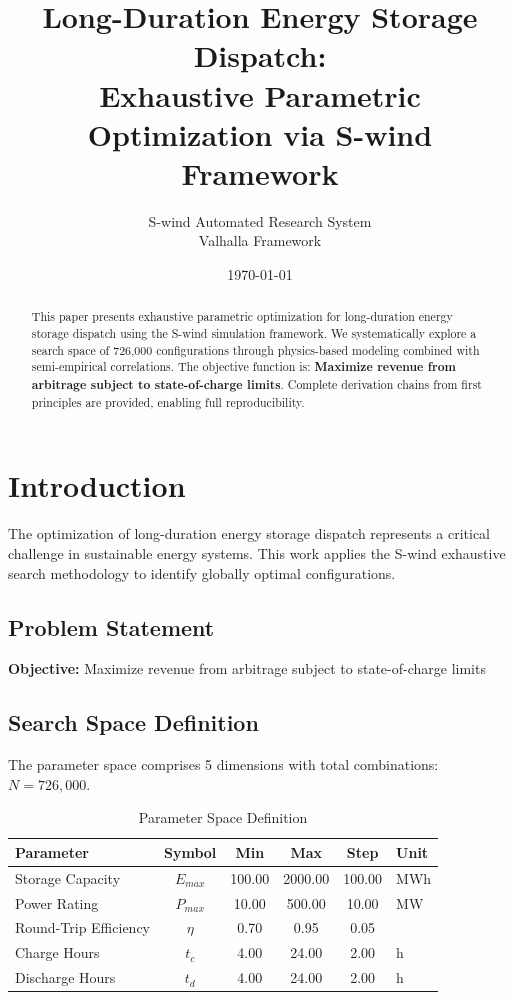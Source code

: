 \documentclass[11pt,twocolumn]{article}
\title{Long-Duration Energy Storage Dispatch: \\Exhaustive Parametric Optimization via S-wind Framework}
\author{S-wind Automated Research System\\Valhalla Framework}
\date{\today}
\begin{document}
\maketitle

\begin{abstract}
This paper presents exhaustive parametric optimization for long-duration energy storage dispatch using the S-wind simulation framework.
We systematically explore a search space of 726,000 configurations through physics-based modeling
combined with semi-empirical correlations. The objective function is: \textbf{Maximize revenue from arbitrage subject to state-of-charge limits}.
Complete derivation chains from first principles are provided, enabling full reproducibility.
\end{abstract}

\section{Introduction}
The optimization of long-duration energy storage dispatch represents a critical challenge in sustainable energy systems.
This work applies the S-wind exhaustive search methodology to identify globally optimal configurations.

\subsection{Problem Statement}
\textbf{Objective:} Maximize revenue from arbitrage subject to state-of-charge limits

\subsection{Search Space Definition}
The parameter space comprises 5 dimensions with total combinations: $N = 726,000$.

\begin{table}[h]
\centering
\caption{Parameter Space Definition}
\begin{tabular}{@{}lccccl@{}}
\toprule
Parameter & Symbol & Min & Max & Step & Unit \\
\midrule
Storage Capacity & $E_{max}$ & 100.00 & 2000.00 & 100.00 & MWh \\
Power Rating & $P_{max}$ & 10.00 & 500.00 & 10.00 & MW \\
Round-Trip Efficiency & $\eta$ & 0.70 & 0.95 & 0.05 &  \\
Charge Hours & $t_c$ & 4.00 & 24.00 & 2.00 & h \\
Discharge Hours & $t_d$ & 4.00 & 24.00 & 2.00 & h \\
\bottomrule
\end{tabular}
\end{table}
\end{document}
